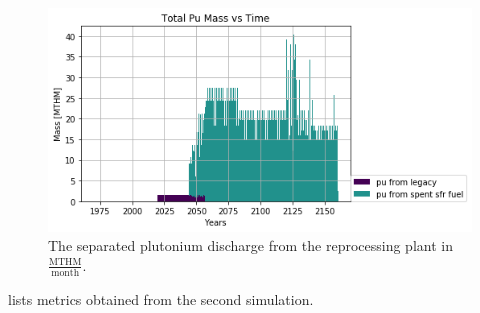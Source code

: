 \begin{figure}[htbp!]
	\begin{center}
		\includegraphics[scale=0.7]{./images/french-transition/pu.png}
	\end{center}
	\caption{The separated plutonium discharge from the reprocessing plant 
        in $\frac{\mbox{MTHM}}{\mbox{month}}$.}
	\label{fig:pu_no_cum}
\end{figure}

  lists metrics obtained from the second simulation.

